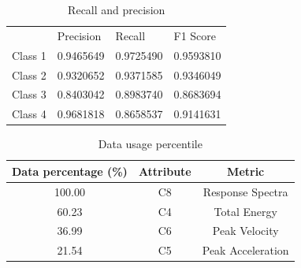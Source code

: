 \begin{table}
\centering
\caption{Recall and precision}
\begin{tabular}{llll}
\hline
        & Precision & Recall  & F1 Score \\ \cline{2-4} 
Class 1 & 0.9465649 &  0.9725490 &  0.9593810 \\
Class 2 & 0.9320652 &  0.9371585 &  0.9346049 \\
Class 3 & 0.8403042 &  0.8983740 &  0.8683694 \\
Class 4 & 0.9681818 &  0.8658537 &  0.9141631 \\ \hline
\end{tabular}
\label{tab:prec_recall_test_2}
\end{table}

\begin{table}
\centering
\caption{Data usage percentile}
\begin{tabular}{ccc}
\hline
Data percentage (\%) & Attribute & Metric                \\ \hline
100.00                 & C8        & Response Spectra      \\
60.23                   & C4        & Total Energy                \\ 
36.99                   & C6        & Peak Velocity      \\
21.54                   & C5        & Peak Acceleration      \\ \hline
\end{tabular}
\label{tab:attribute_usage_2}
\end{table}




                                          
                                          




